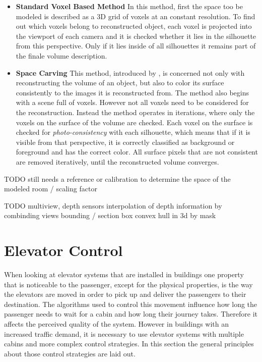 \begin{itemize}
    \item \textbf{Standard Voxel Based Method} 
    In this method, first the space too be modeled is described as a \ac{3D} grid of voxels at an constant resolution.
    To find out which voxels belong to reconstructed object,
    each voxel is projected into the viewport of each camera 
    and it is checked whether it lies in the silhouette from this perspective.
    Only if it lies inside of all silhouettes
    it remains part of the finale volume description.
    \item \textbf{Space Carving}
    This method, introduced by \textcite[][]{kutulakos1999spacecarving},
    is concerned not only with reconstructing the volume of an object, but also to color its surface consistently to the images it is reconstructed from.
    The method also begins with a scene full of voxels. 
    However not all voxels need to be considered for the reconstruction.
    Instead the method operates in iterations, where only the voxels on the surface of the volume are checked.
    Each voxel on the surface is checked for \emph{photo-consistency} with each silhouette, which means that if it is visible from that perspective, it is correctly classified as background or foreground and has the correct color.
    All surface pixels that are not consistent are removed iteratively, until the reconstructed volume converges.
\end{itemize}

TODO still needs a reference or calibration to determine the space of the modeled room / scaling factor

TODO
multiview, depth sensors
interpolation of depth information by combinding views
bounding / section box
convex hull in 3d by mask


\section{Elevator Control}

When looking at elevator systems that are installed in buildings
one property that is noticeable to the passenger, except for the physical properties, is the way the elevators are moved in order to pick up and deliver the passengers to their destination.
The algorithms used to control this movement influence how long the passenger needs to wait for a cabin and how long their journey takes.
Therefore it affects the perceived quality of the system.
However in buildings with an increased traffic demand, it is necessary to use elevator systems with multiple cabins and more complex control strategies.
In this section the general principles about those control strategies are laid out.

